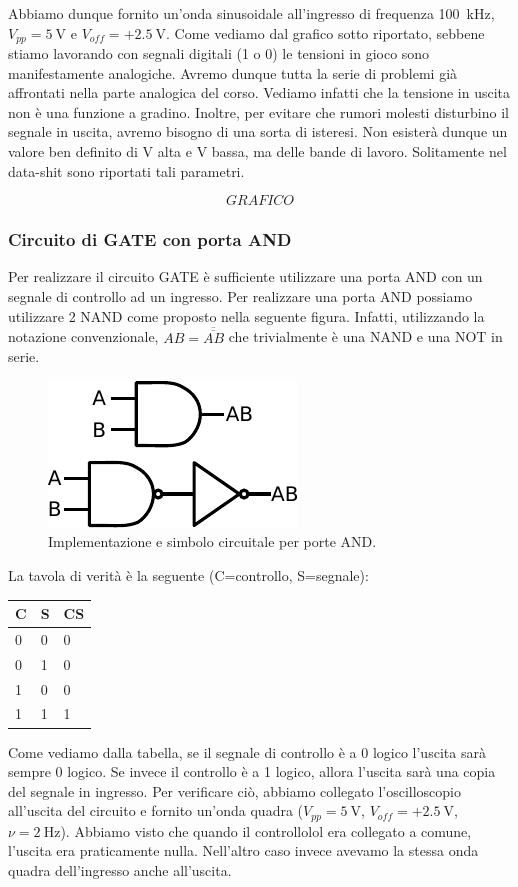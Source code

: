 Abbiamo dunque fornito un'onda sinusoidale all'ingresso di frequenza \SI{100}{\kilo\hertz}, $V_{pp}=\SI{5}{\volt}$ e $V_{off}=+\SI{2.5}{\volt}$. Come vediamo dal grafico sotto riportato, sebbene stiamo lavorando con segnali digitali (1 o 0) le tensioni in gioco sono manifestamente analogiche. Avremo dunque tutta la serie di problemi già affrontati nella parte analogica del corso. Vediamo infatti che la tensione in uscita non è una funzione a gradino. Inoltre, per evitare che rumori molesti disturbino il segnale in uscita, avremo bisogno di una sorta di isteresi. Non esisterà dunque un valore ben definito di V alta e V bassa, ma delle bande di lavoro. Solitamente nel data-shit sono riportati tali parametri.

$$GRAFICO$$

\subsubsection{Circuito di GATE con porta AND}
Per realizzare il circuito GATE è sufficiente utilizzare una porta AND con un segnale di controllo ad un ingresso. Per realizzare una porta AND possiamo utilizzare 2 NAND come proposto nella seguente figura. Infatti, utilizzando la notazione convenzionale, $AB=\overline {\overline {AB}}$ che trivialmente è una NAND e una NOT in serie.
 
\begin{figure}
\centering
\includegraphics[width=.15\textwidth]{../E09/latex/AND.pdf}
\caption{Implementazione e simbolo circuitale per porte AND.}
\label{cir9:and}
\end{figure}

La tavola di verità è la seguente (C=controllo, S=segnale):

\begin{tabular}{|l|l|l|}
\hline
C & S & CS \\
\hline
0 & 0 & 0\\
\hline
0 & 1 & 0\\
\hline
1 & 0 & 0\\
\hline
1 & 1 & 1\\
\hline
\end{tabular}

Come vediamo dalla tabella, se il segnale di controllo è a 0 logico l'uscita sarà sempre 0 logico. Se invece il controllo è a 1 logico, allora l'uscita sarà una copia del segnale in ingresso. Per verificare ciò, abbiamo collegato l'oscilloscopio all'uscita del circuito e fornito un'onda quadra ($V_{pp}=\SI{5}{\volt}$, $V_{off}=+\SI{2.5}{\volt}$, $\nu=\SI{2}{\hertz}$). Abbiamo visto che quando il controllolol era collegato a comune, l'uscita era praticamente nulla. Nell'altro caso invece avevamo la stessa onda quadra dell'ingresso anche all'uscita.

